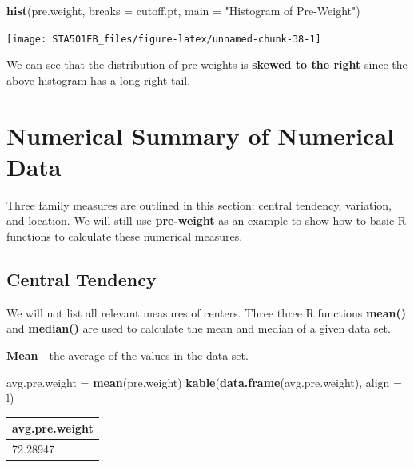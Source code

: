 \documentclass[
]{book}
\newenvironment{Shaded}{\begin{snugshade}}{\end{snugshade}}
\newcommand{\AttributeTok}[1]{\textcolor[rgb]{0.13,0.29,0.53}{#1}}
\newcommand{\FunctionTok}[1]{\textcolor[rgb]{0.13,0.29,0.53}{\textbf{#1}}}
\newcommand{\NormalTok}[1]{#1}
\newcommand{\OtherTok}[1]{\textcolor[rgb]{0.56,0.35,0.01}{#1}}
\newcommand{\StringTok}[1]{\textcolor[rgb]{0.31,0.60,0.02}{#1}}
\begin{document}
\begin{Shaded}
\begin{Highlighting}[]
\FunctionTok{hist}\NormalTok{(pre.weight, }\AttributeTok{breaks =}\NormalTok{ cutoff.pt,}
     \AttributeTok{main =} \StringTok{"Histogram of Pre{-}Weight"}\NormalTok{)}
\end{Highlighting}
\end{Shaded}

\begin{center}\texttt{[image: STA501EB\_files/figure-latex/unnamed-chunk-38-1]} \end{center}

We can see that the distribution of pre-weights is \textbf{skewed to the right} since the above histogram has a long right tail.

\hypertarget{numerical-summary-of-numerical-data}{%
\section{Numerical Summary of Numerical Data}\label{numerical-summary-of-numerical-data}}

Three family measures are outlined in this section: central tendency, variation, and location. We will still use \textbf{pre-weight} as an example to show how to basic R functions to calculate these numerical measures.

\hypertarget{central-tendency}{%
\subsection{Central Tendency}\label{central-tendency}}

We will not list all relevant measures of centers. Three three R functions \textbf{mean()} and \textbf{median()} are used to calculate the mean and median of a given data set.

\textbf{Mean} - the average of the values in the data set.

\begin{Shaded}
\begin{Highlighting}[]
\NormalTok{avg.pre.weight }\OtherTok{=} \FunctionTok{mean}\NormalTok{(pre.weight)}
\FunctionTok{kable}\NormalTok{(}\FunctionTok{data.frame}\NormalTok{(avg.pre.weight), }\AttributeTok{align =} \StringTok{\textquotesingle{}l\textquotesingle{}}\NormalTok{)}
\end{Highlighting}
\end{Shaded}

\begin{tabular}{l}
\hline
avg.pre.weight\\
\hline
72.28947\\
\hline
\end{tabular}
\end{document}
